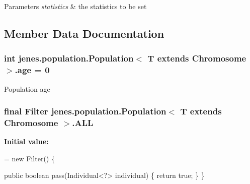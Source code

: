 \begin{DoxyParams}{Parameters}
{\em statistics} & the statistics to be set \\
\hline
\end{DoxyParams}


\subsection{Member Data Documentation}
\hypertarget{classjenes_1_1population_1_1_population_3_01_t_01extends_01_chromosome_01_4_a0f21ed32d1bb2e1d3f3663c86351a803}{
\subsubsection[{age}]{\setlength{\rightskip}{0pt plus 5cm}int jenes.\-population.\-Population$<$ T extends Chromosome $>$.age = 0\hspace{0.3cm}{\ttfamily [private]}}}\label{classjenes_1_1population_1_1_population_3_01_t_01extends_01_chromosome_01_4_a0f21ed32d1bb2e1d3f3663c86351a803}
Population age \hypertarget{classjenes_1_1population_1_1_population_3_01_t_01extends_01_chromosome_01_4_a5cfea1b7e0a14171b85d3ae7460f0723}{
\subsubsection[{A\-L\-L}]{\setlength{\rightskip}{0pt plus 5cm}final Filter jenes.\-population.\-Population$<$ T extends Chromosome $>$.A\-L\-L\hspace{0.3cm}{\ttfamily [static]}}}\label{classjenes_1_1population_1_1_population_3_01_t_01extends_01_chromosome_01_4_a5cfea1b7e0a14171b85d3ae7460f0723}
{\bfseries Initial value\-:}
\begin{DoxyCode}
= \textcolor{keyword}{new} Filter() \{

        \textcolor{keyword}{public} \textcolor{keywordtype}{boolean} pass(Individual<?> individual) \{
            \textcolor{keywordflow}{return} \textcolor{keyword}{true};
        \}
    \}
\end{DoxyCode}
